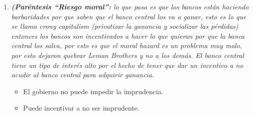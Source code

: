 \begin{enumerate}
    \item \emph{\textbf{(Paréntesis ``Riesgo moral'':} lo que pasa es que los bancos están haciendo barbaridades por que saben que el banco central los va a ganar, esto es lo que se llama crony capitalism (privatizar la ganancia y socializar las pérdidas) entonces los bancos son incentivados a hacer lo que quieran por que la banca central los salva, por esto es que el moral hazard es un problema muy malo, por esto dejaron quebrar Leman Brothers y no a los demás. El banco central tiene un tipo de interés alto por el hecho de tener que dar un incentivo a no acudir al banco central para adquirir ganancia.}
        \begin{itemize}
            \item El gobierno no puede impedir la imprudencia.
            \item Puede incentivar a no ser imprudente.
        \end{itemize}
\end{enumerate}
